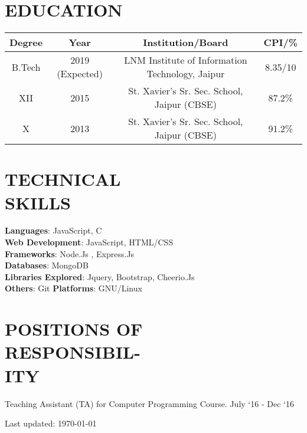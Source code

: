 \documentclass[margin]{res}
\begin{document}
\begin{resume}

\section{EDUCATION}

\begin{tabular}{|c|c|c|c|}

\hline
\textbf{Degree} & \textbf{Year} & {Institution/Board} & {CPI/\%} \\
\hline
B.Tech & 2019 (Expected) & LNM Institute of Information Technology, Jaipur & 8.35/10 \\
\hline
XII & 2015 & St. Xavier’s Sr. Sec. School, Jaipur (CBSE) & 87.2\% \\
\hline
X & 2013 & St. Xavier’s Sr. Sec. School, Jaipur (CBSE) & 91.2\% \\
\hline
\end{tabular}

\section{TECHNICAL \\ SKILLS}
  {\textbf{Languages}:} JavaScript, C\\
	{\textbf{Web Development}:} JavaScript, HTML/CSS\\
  {\textbf{Frameworks}:} Node.Js , Express.Js\\
  {\textbf{Databases}:} MongoDB\\
  {\textbf{Libraries Explored}:} Jquery, Bootstrap, Cheerio.Js\\
  {\textbf{Others}:} Git
  {\textbf{Platforms}:} GNU/Linux

\section{POSITIONS OF\\ RESPONSIBIL-\\ITY}
    Teaching Assistant (TA) for Computer Programming Course. \hfill July `16 - Dec `16\\

\begin{center}
  \begin{footnotesize}
    Last updated: \today \\
  \end{footnotesize}
\end{center}

\end{resume}
\end{document}

